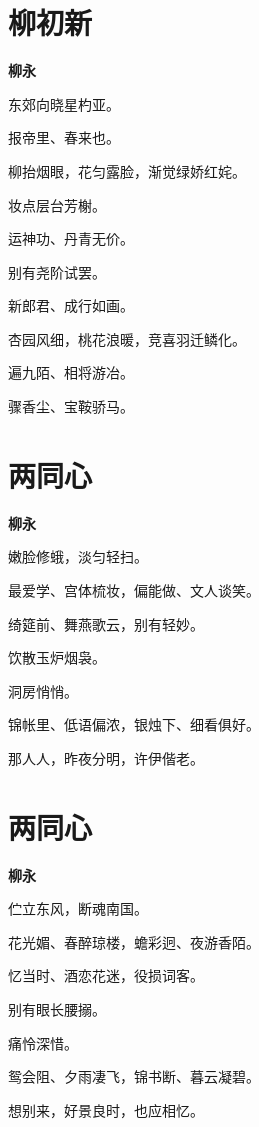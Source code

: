 \documentclass[12pt,a4paper]{ctexbook}
\begin{document}
\section{柳初新}
\textbf{柳永}\par\vspace{0.5em}
东郊向晓星杓亚。\par
报帝里、春来也。\par
柳抬烟眼，花匀露脸，渐觉绿娇红姹。\par
妆点层台芳榭。\par
运神功、丹青无价。\par
别有尧阶试罢。\par
新郎君、成行如画。\par
杏园风细，桃花浪暖，竞喜羽迁鳞化。\par
遍九陌、相将游冶。\par
骤香尘、宝鞍骄马。\par

\section{两同心}
\textbf{柳永}\par\vspace{0.5em}
嫩脸修蛾，淡匀轻扫。\par
最爱学、宫体梳妆，偏能做、文人谈笑。\par
绮筵前、舞燕歌云，别有轻妙。\par
饮散玉炉烟袅。\par
洞房悄悄。\par
锦帐里、低语偏浓，银烛下、细看俱好。\par
那人人，昨夜分明，许伊偕老。\par

\section{两同心}
\textbf{柳永}\par\vspace{0.5em}
伫立东风，断魂南国。\par
花光媚、春醉琼楼，蟾彩迥、夜游香陌。\par
忆当时、酒恋花迷，役损词客。\par
别有眼长腰搦。\par
痛怜深惜。\par
鸳会阻、夕雨凄飞，锦书断、暮云凝碧。\par
想别来，好景良时，也应相忆。\par
\end{document}
